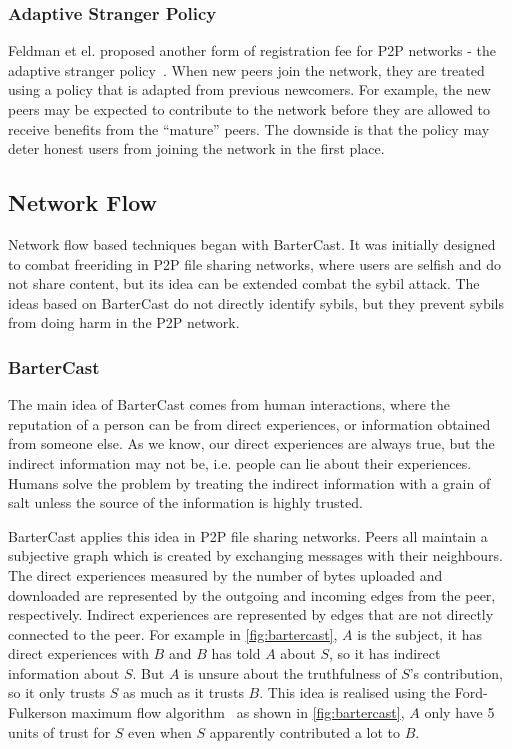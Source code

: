 \subsubsection{Adaptive Stranger Policy}
Feldman et el. proposed another form of registration fee for P2P networks - the
adaptive stranger policy~\cite{feldman2004robust}. When new peers join the
network, they are treated using a policy that is adapted from previous
newcomers. For example, the new peers may be expected to contribute to the
network before they are allowed to receive benefits from the ``mature'' peers.
The downside is that the policy may deter honest users from joining the network
in the first place.


\subsection{Network Flow}\label{sec:network-flow}
Network flow based techniques began with
BarterCast\cite{meulpolder2009bartercast}. It was initially designed to combat
freeriding in P2P file sharing networks, where users are selfish and do not
share content, but its idea can be extended combat the sybil attack. The ideas
based on BarterCast do not directly identify sybils, but they prevent sybils
from doing harm in the P2P network.

\subsubsection{BarterCast}
The main idea of BarterCast comes from human interactions, where the reputation
of a person can be from direct experiences, or information obtained from someone
else. As we know, our direct experiences are always true, but the indirect
information may not be, i.e. people can lie about their experiences. Humans
solve the problem by treating the indirect information with a grain of salt
unless the source of the information is highly trusted.

BarterCast applies this idea in P2P file sharing networks. Peers all maintain a
subjective graph which is created by exchanging messages with their neighbours.
The direct experiences measured by the number of bytes uploaded and downloaded
are represented by the outgoing and incoming edges from the peer, respectively.
Indirect experiences are represented by edges that are not directly connected to
the peer. For example in \autoref{fig:bartercast}, $A$ is the subject, it has
direct experiences with $B$ and $B$ has told $A$ about $S$, so it has indirect
information about $S$. But $A$ is unsure about the truthfulness of $S$'s
contribution, so it only trusts $S$ as much as it trusts $B$. This idea is
realised using the Ford-Fulkerson maximum flow
algorithm~\cite{thomas2001introduction} as shown in \autoref{fig:bartercast},
$A$ only have 5 units of trust for $S$ even when $S$ apparently contributed a
lot to $B$.

